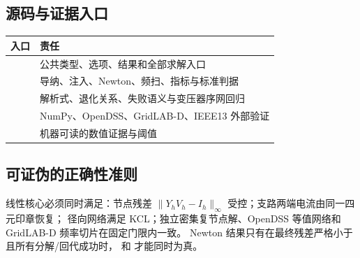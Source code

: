 \subsection{源码与证据入口}
\begin{center}\footnotesize
\begin{tabular}{@{}L{5.3cm}L{9.2cm}@{}}
\toprule
入口 & 责任\\ \midrule
{} & 公共类型、选项、结果和全部求解入口\\
 & 导纳、注入、Newton、频扫、指标与标准判据\\
 & 解析式、退化关系、失败语义与变压器序网回归\\
 & NumPy、OpenDSS、GridLAB-D、IEEE13 外部验证\\
 & 机器可读的数值证据与阈值\\
\bottomrule
\end{tabular}
\end{center}

\subsection{可证伪的正确性准则}
线性核心必须同时满足：节点残差 $\|Y_hV_h-I_h\|_\infty$ 受控；支路两端电流由同一四元印章恢复；
径向网络满足 KCL；独立密集复节点解、OpenDSS 等值网络和 GridLAB-D 频率切片在固定门限内一致。
Newton 结果只有在最终残差严格小于  且所有分解/回代成功时， 和
 才能同时为真。

